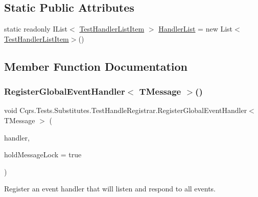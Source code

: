 \subsection*{Static Public Attributes}
\begin{DoxyCompactItemize}
\item 
static readonly I\+List$<$ \hyperlink{classCqrs_1_1Tests_1_1Substitutes_1_1TestHandlerListItem}{Test\+Handler\+List\+Item} $>$ \hyperlink{classCqrs_1_1Tests_1_1Substitutes_1_1TestHandleRegistrar_a56823149a39f6208108030de47e70e09_a56823149a39f6208108030de47e70e09}{Handler\+List} = new List$<$\hyperlink{classCqrs_1_1Tests_1_1Substitutes_1_1TestHandlerListItem}{Test\+Handler\+List\+Item}$>$()
\end{DoxyCompactItemize}


\subsection{Member Function Documentation}
\mbox{\label{classCqrs_1_1Tests_1_1Substitutes_1_1TestHandleRegistrar_a6fd2aec4c9924697b2d025d55c085502_a6fd2aec4c9924697b2d025d55c085502}} 
\subsubsection{\texorpdfstring{Register\+Global\+Event\+Handler$<$ T\+Message $>$()}{RegisterGlobalEventHandler< TMessage >()}}
{\footnotesize\ttfamily void Cqrs.\+Tests.\+Substitutes.\+Test\+Handle\+Registrar.\+Register\+Global\+Event\+Handler$<$ T\+Message $>$ (\begin{DoxyParamCaption}\item[{Action$<$ T\+Message $>$}]{handler,  }\item[{bool}]{hold\+Message\+Lock = {\ttfamily true} }\end{DoxyParamCaption})}



Register an event handler that will listen and respond to all events. 



